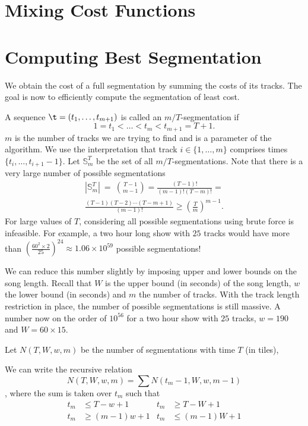\documentclass[twocolumn]{article}
\newcommand{\segs}{\mathbb S}
\begin{document}
\section{Mixing Cost Functions}



\section{Computing Best Segmentation}\label{best_cost}

We obtain the cost of a full segmentation by summing the costs of its tracks. The goal is now to efficiently compute the segmentation of least cost.


A sequence $\t = (t_1, \ldots, t_{m+1})$ is called an $m/T$-segmentation if
\[
1 = t_1 < \ldots < t_m < t_{m+1} = T+1.
\]
$m$ is the number of tracks we are trying to find and is a parameter of the algorithm. We use the interpretation that track $i \in \{1, \ldots, m\}$ comprises times $\{t_i, \ldots, t_{i+1}-1\}$. Let $\segs^T_m$ be the set of all $m/T$-segmentations. Note that there is a very large number of possible segmentations 
\begin{multline*}
|\segs^T_m| ~=~ \binom{T-1}{m-1}
= \frac{(T-1)!}{(m-1)!(T-m)!} =\\
 \frac{(T-1)(T-2)\cdots(T-m+1)}{(m-1)!} \ge \left( \frac{T}{m}\right)^{m-1}.
\end{multline*} 
For large values of $T$, considering all possible segmentations using brute force is infeasible. For example, a two hour long show with $25$ tracks would have more than $\left( \frac{60^2 \times 2}{25}\right)^{24}  \approx 1.06 \times 10^{59}$ possible segmentations! 

We can reduce this number slightly by imposing upper and lower bounds on the song length.  Recall that $W$ is the upper bound (in seconds) of the song length, $w$ the lower bound (in seconds) and $m$ the number of tracks. With the track length restriction in place, the number of possible segmentations is still massive. A number now on the order of $10^{56}$ for a two hour show with $25$ tracks, $w=190$ and $W=60\times15$.



  Let $N(T,W,w,m)$ be the number of segmentations with time $T$ (in tiles),

We can write the recursive relation $$N(T,W,w,m) = \sum N(t_m-1,W,w,m-1)$$, where the sum is taken over $t_m$ such that 
\begin{align*}
t_m &\le T-w+1 & t_m &\ge T-W+1\\
t_m &\ge (m-1)w+1 & t_m &\le (m-1)W+1
\end{align*}
\end{document}
